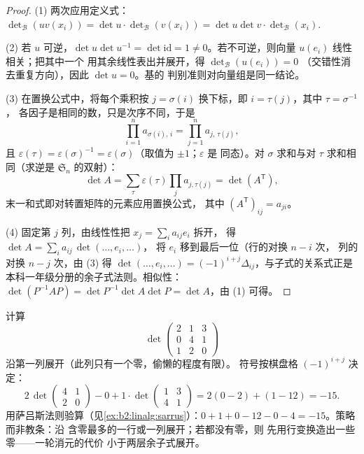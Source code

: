 \begin{proof}
(1) 两次应用定义式：
$\det_{\mathcal B}(uv(x_i)) = \det u \cdot \det_{\mathcal
B}(v(x_i)) = \det u \det v \cdot \det_{\mathcal B}(x_i)$.

(2) 若 $u$ 可逆，$\det u \det u^{-1} = \det \mathrm{id} =
1 \neq 0$。若不可逆，则向量 $u(e_i)$ 线性相关；把其中一个
用其余线性表出并展开，得 $\det_{\mathcal B}(u(e_i)) = 0$
（交错性消去重复方向），因此 $\det u = 0$。基的
判别准则对向量组是同一结论。

(3) 在置换公式中，将每个乘积按 $j =
\sigma(i)$ 换下标，即 $i = \tau(j)$，其中 $\tau = \sigma^{-1}$，
各因子是相同的数，只是次序不同，于是
\[
\prod_{i=1}^{n} a_{\sigma(i),\,i} = \prod_{j=1}^{n}
a_{j,\,\tau(j)} ,
\]
且 $\varepsilon(\tau) = \varepsilon(\sigma)^{-1} =
\varepsilon(\sigma)$（取值为 $\pm1$；$\varepsilon$ 是
同态）。对 $\sigma$ 求和与对
$\tau$ 求和相同（求逆是 $\mathfrak{S}_n$ 的双射）：
\[
\det A = \sum_{\tau}\varepsilon(\tau)\prod_j a_{j,\tau(j)}
= \det(A^{\mathsf T}),
\]
末一和式即对转置矩阵的元素应用置换公式，
其中 $(A^{\mathsf T})_{ij} = a_{ji}$。

(4) 固定第 $j$ 列，由线性性把 $x_j = \sum_i a_{ij} e_i$ 拆开，
得 $\det A = \sum_i a_{ij}\, \det(\dots, e_i, \dots)$，
将 $e_i$ 移到最后一位（行的对换 $n - i$ 次，
列的对换 $n - j$ 次，由 (3) 得 $\det(\dots, e_i, \dots) =
(-1)^{i+j}\Delta_{ij}$，与子式的关系式正是
本科一年级分册的余子式法则。相似性：$\det(P^{-1}AP) = \det P^{-1}\det A \det P =
\det A$，由 (1) 可得。
\end{proof}

\begin{example}[余子式展开的具体计算]\label{ex:b2:linalg:cofactorwork}
计算
\[
\det\begin{pmatrix}
2 & 1 & 3\\
0 & 4 & 1\\
1 & 2 & 0
\end{pmatrix}
\]
沿第一列展开（此列只有一个零，偷懒的程度有限）。
符号按棋盘格 $(-1)^{i+j}$ 决定：
\[
2\,\det\begin{pmatrix}4 & 1\\ 2 & 0\end{pmatrix}
- 0
+ 1\cdot\det\begin{pmatrix}1 & 3\\ 4 & 1\end{pmatrix}
= 2(0 - 2) + (1 - 12) = -15 .
\]
用萨吕斯法则验算（见\cref{ex:b2:linalg:sarrus}）：$0 + 1 + 0
- 12 - 0 - 4 = -15$。策略而非教条：沿
含零最多的一行或一列展开；若都没有零，则
先用行变换造出一些零——一轮消元的代价
小于两层余子式展开。
\end{example}

